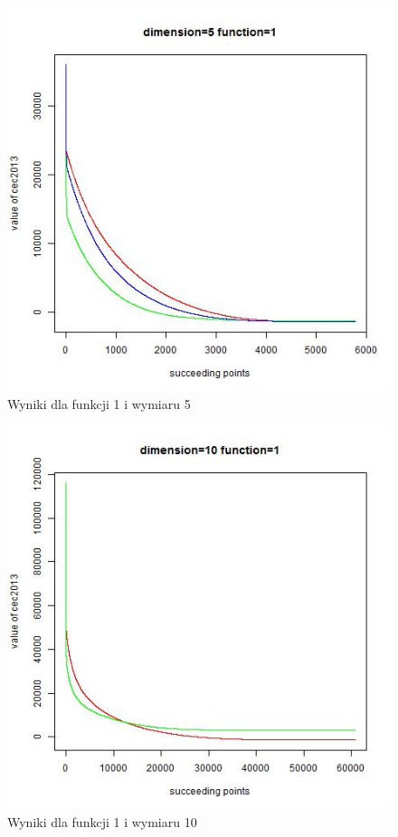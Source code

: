 \documentclass{article}
\begin{document}
\begin{figure}[H]
\centering
\includegraphics[scale=0.6]{dim_5__func_1}
\caption{Wyniki dla funkcji 1 i wymiaru 5}
\end{figure}

\begin{figure}[H]
\centering
\includegraphics[scale=0.6]{dim_10__func_1}
\caption{Wyniki dla funkcji 1 i wymiaru 10}
\end{figure}
\end{document}
